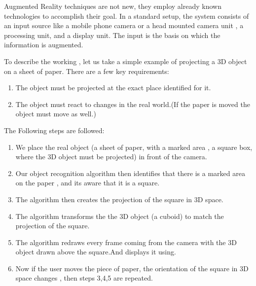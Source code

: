 Augmented Reality techniques are not new, they employ already known
technologies to accomplish their goal. In a standard setup, the system
consists of an input source like a mobile phone camera or a head mounted 
camera unit , a processing unit, and a display unit. The input is the
basis on which the information is augmented.

To describe the working , let us take a simple example of projecting
a 3D object on a sheet of paper.
There are a few key requirements:
\begin{enumerate}
\item 
The object must be projected at the exact place identified for it.
\item
The object must react to changes in the real world.(If the paper
is moved the object must move as well.)
\end{enumerate}

\vspace*{5px}
The Following steps are followed:
\begin{enumerate}

\item
We place the real object (a sheet of paper, with a marked
area , a square box, where the 3D object must be projected) in front
of the camera.



\item
Our object recognition algorithm then identifies that there
is a marked area on the paper , and its aware that it is a square.

\item
The algorithm then creates the projection of the square in 3D space.

\item
The algorithm transforms the the 3D object (a cuboid) to match the
projection of the square.

\item
The algorithm redraws every frame coming from the camera with the
3D object drawn above the square.And displays it using.


\item
Now if the user moves the piece of paper, the orientation of the
square in 3D space changes , then steps 3,4,5 are repeated.


\end{enumerate}

